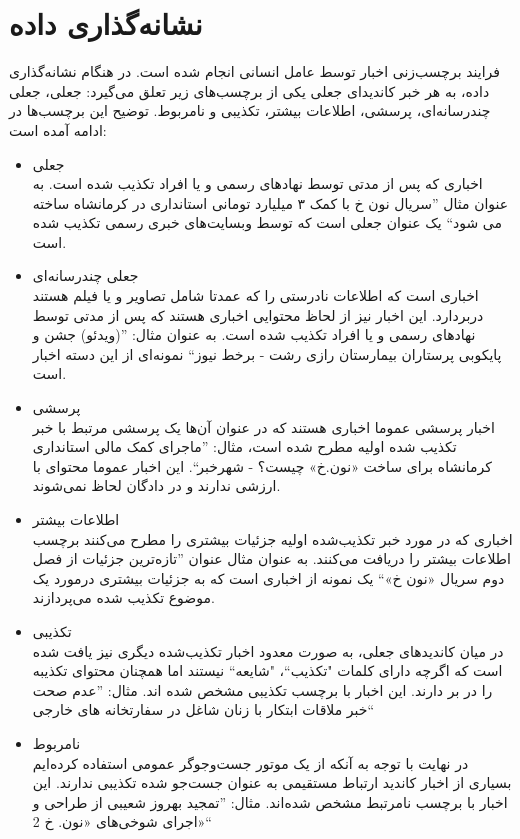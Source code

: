 \section{نشانه‌گذاری داده}
فرایند برچسب‌زنی اخبار توسط عامل انسانی انجام شده ‌است.  در هنگام نشانه‌گذاری داده، به هر خبر کاندیدای جعلی یکی از برچسب‌های زیر تعلق می‌گیرد: جعلی، جعلی چندرسانه‌ای، پرسشی، اطلاعات بیشتر، تکذیبی و نامربوط. توضیح این برچسب‌ها در ادامه آمده است:
\begin{itemize}
\item جعلی \\
اخباری که پس از مدتی توسط نهاد‌های رسمی و یا افراد تکذیب شده است. به عنوان مثال ''سریال نون خ با کمک ۳ میلیارد تومانی استانداری در کرمانشاه ساخته می شود`` یک عنوان جعلی است که توسط وبسایت‌های خبری رسمی تکذیب شده است.

\item جعلی چندرسانه‌ای \\
اخباری است که اطلاعات نادرستی را که عمدتا شامل تصاویر و یا فیلم هستند دربردارد. 
این اخبار نیز از لحاظ محتوایی اخباری هستند که پس از مدتی توسط نهاد‌های رسمی و یا افراد تکذیب شده است.
به عنوان مثال: ''(ویدئو) جشن و پایکوبی پرستاران بیمارستان رازی رشت - برخط نیوز`` نمونه‌ای از این دسته اخبار است.

\item پرسشی \\
اخبار پرسشی عموما اخباری هستند که در عنوان‌ آن‌ها یک پرسشی مرتبط با خبر تکذیب شده اولیه مطرح شده است، مثال: ''ماجرای کمک مالی استانداری کرمانشاه برای ساخت «نون‌.خ» چیست؟ - شهرخبر``. این اخبار عموما محتوای با ارزشی ندارند و در دادگان لحاظ نمی‌شوند.

\item اطلاعات بیشتر \\
اخباری که در مورد خبر تکذیب‌شده اولیه جزئیات بیشتری را مطرح می‌کنند برچسب اطلاعات بیشتر را دریافت می‌کنند. به عنوان مثال عنوان ''تازه‌ترین جزئیات از فصل دوم سریال «نون خ»`` یک نمونه از اخباری است که به جزئیات بیشتری درمورد یک موضوع تکذیب شده می‌پردازند.
\item تکذیبی \\
در میان کاندید‌های جعلی، به صورت معدود اخبار تکذیب‌شده دیگری نیز یافت شده است که اگرچه دارای کلمات "تکذیب``، "شایعه`` نیستند اما همچنان محتوای تکذیبه را در بر دارند. این اخبار با برچسب تکذیبی مشخص شده اند. مثال: ''عدم صحت خبر ملاقات ابتكار با زنان شاغل در سفارتخانه های خارجی``

\item نامربوط \\
در نهایت با توجه به آنکه از یک موتور جست‌و‌جوگر عمومی استفاده کرده‌ایم بسیاری از اخبار کاندید ارتباط مستقیمی به عنوان جست‌جو شده تکذیبی ندارند. این اخبار با برچسب نامرتبط مشخص شده‌اند. مثال: ''تمجید بهروز شعیبی از طراحی و اجرای شوخی‌های «نون. خ 2»``

\end{itemize}

